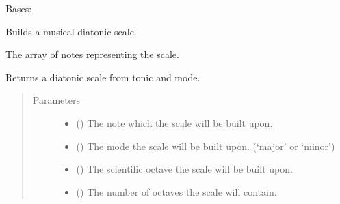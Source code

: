 \documentclass[letterpaper,10pt,english]{sphinxmanual}
\begin{document}

\begin{fulllineitems}
\label{\detokenize{index:birdears.scale.DiatonicScale}}
Bases: {\hyperref[\detokenize{index:birdears.scale.ScaleBase}]{}}

Builds a musical diatonic scale.

\begin{fulllineitems}
\label{\detokenize{index:birdears.scale.DiatonicScale.scale}}
 \textendash{} The array of notes representing the scale.

\end{fulllineitems}


\begin{fulllineitems}
\label{\detokenize{index:birdears.scale.DiatonicScale.__init__}}
Returns a diatonic scale from tonic and mode.
\begin{quote}\begin{description}
\item[{Parameters}] \leavevmode\begin{itemize}
\item {} 
 () \textendash{} The note which the scale will be built upon.

\item {} 
 () \textendash{} The mode the scale will be built upon.
(‘major’ or ‘minor’)

\item {} 
 () \textendash{} The scientific octave the scale will be built upon.

\item {} 
 () \textendash{} The number of octaves the scale will contain.


\end{itemize}
\end{description}
\end{quote}
\end{fulllineitems}
\end{fulllineitems}
\end{document}
